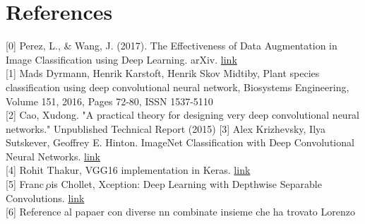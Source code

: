 \documentclass[11pt, oneside]{article}
\begin{document}
\section*{References}
[0] Perez, L., \& Wang, J. (2017). The Effectiveness of Data Augmentation in Image Classification using Deep Learning. arXiv. \href{https://doi.org/10.48550/arXiv.1712.04621}{link}\\
{[1]} Mads Dyrmann, Henrik Karstoft, Henrik Skov Midtiby, Plant species classification using deep convolutional neural network, Biosystems Engineering, Volume 151, 2016, Pages 72-80, ISSN 1537-5110 \\
{[2]} Cao, Xudong. "A practical theory for designing very deep convolutional neural networks." Unpublished Technical Report (2015)
{[3]} Alex Krizhevsky, Ilya Sutskever, Geoffrey E. Hinton. ImageNet Classification with Deep Convolutional Neural Networks. \href{https://proceedings.neurips.cc/paper/2012/file/c399862d3b9d6b76c8436e924a68c45b-Paper.pdf}{link} \\
{[4]} Rohit Thakur, VGG16 implementation in Keras. \href{https://towardsdatascience.com/step-by-step-vgg16-implementation-in-keras-for-beginners-a833c686ae6c}{link}\\
{[5]} Franc ̧ois Chollet, Xception: Deep Learning with Depthwise Separable Convolutions. \href{https://arxiv.org/pdf/1610.02357.pdf}{link}\\
{[6]} Reference al papaer con diverse nn combinate insieme che ha trovato Lorenzo
\end{document}
